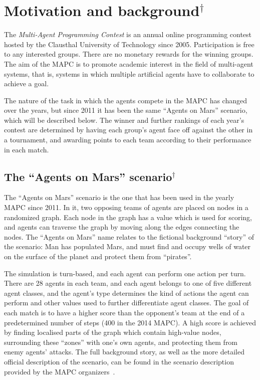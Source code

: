 \section{Motivation and background$^\dagger$}
\label{alg:zon_calculation}
The \emph{Multi-Agent Programming Contest} is an annual online programming contest hosted by the Clausthal University of Technology since 2005.
Participation is free to any interested groups.
There are no monetary rewards for the winning groups.
The aim of the MAPC is to promote academic interest in the field  of multi-agent systems, that is, systems in which multiple artificial agents have to collaborate to achieve a goal.

The nature of the task in which the agents compete in the MAPC has changed over the years, but since 2011 it has been the same \enquote{Agents on Mars} scenario, which will be described below.
The winner and further rankings of each year's contest are determined by having each group's agent face off against the other in a tournament, and awarding points to each team according to their performance in each match.

\subsection{The \enquote{Agents on Mars} scenario$^\dagger$}
The \enquote{Agents on Mars} scenario is the one that has been used in the yearly MAPC since 2011.
In it, two opposing teams of agents are placed on nodes in a randomized graph.
Each node in the graph has a value which is used for scoring, and agents can traverse the graph by moving along the edges connecting the nodes.
The \enquote{Agents on Mars} name relates to the fictional background \enquote{story} of the scenario: Man has populated Mars, and must find and occupy wells of water on the surface of the planet and protect them from \enquote{pirates}.

The simulation is turn-based, and each agent can perform one action per turn.
There are 28 agents in each team, and each agent belongs to one of five different agent classes, and the agent's type determines the kind of actions the agent can perform and other values used to further differentiate agent classes.
The goal of each match is to have a higher score than the opponent's team at the end of a predetermined number of steps (400 in the 2014 MAPC).
A high score is achieved by finding localised parts of the graph which contain high-value nodes, surrounding these \enquote{zones} with one's own agents, and protecting them from enemy agents' attacks.
The full background story, as well as the more detailed official description of the scenario, can be found in the scenario description provided by the MAPC organizers~\cite{ahlbrecht_mapc_2014}.

